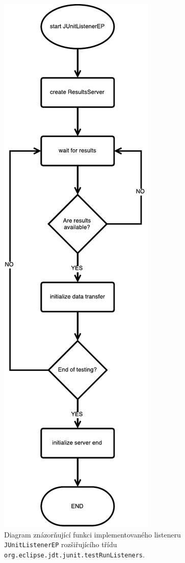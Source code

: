 	\begin{figure}[h]
	  \includegraphics[width=\textwidth, height=0.8\textheight, keepaspectratio, center]{obrazky-figures/inrunjunit_listener_flowchart.pdf}
	  \caption{Diagram znázorňující funkci implementovaného listeneru \texttt{JUnitListenerEP} rozšiřujícího třídu \texttt{org.eclipse.jdt.junit.testRunListeners}.}
	  \label{fig:listener_flowchart}
	\end{figure}
      
